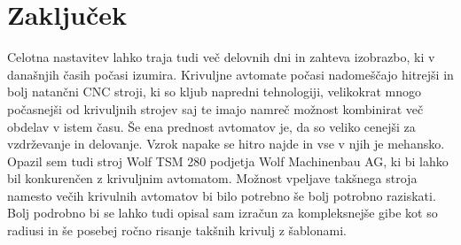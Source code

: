 \newpage
\section{Zaključek}
Celotna nastavitev lahko traja tudi več delovnih dni in zahteva
izobrazbo, ki v današnjih časih počasi izumira. Krivuljne avtomate
počasi nadomeščajo hitrejši in bolj natančni CNC stroji, ki so kljub
napredni tehnologiji, velikokrat mnogo počasnejši od krivuljnih strojev saj te
imajo namreč možnost kombinirat več obdelav v istem času. Še ena prednost avtomatov je, da so veliko cenejši
za vzdrževanje in delovanje. Vzrok napake se hitro najde in vse v njih je
mehansko. Opazil sem tudi stroj Wolf TSM 280 podjetja Wolf Machinenbau AG,
ki bi lahko bil konkurenčen z krivuljnim avtomatom. Možnost vpeljave
takšnega stroja namesto večih krivulnih avtomatov bi bilo potrebno
še bolj potrobno raziskati. Bolj podrobno bi se lahko tudi opisal
sam izračun za kompleksnejše gibe kot so radiusi in še posebej
ročno risanje takšnih krivulj z šablonami.